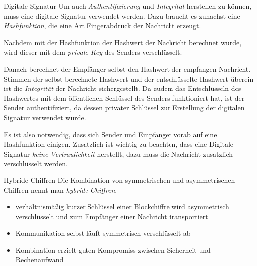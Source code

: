 \documentclass[german]{spicker}
\begin{document}
\begin{defi}{Digitale Signatur}
    Um auch \emph{Authentifizierung}
    und \emph{Integritat} herstellen zu können, muss eine digitale Signatur verwendet
    werden. Dazu braucht es zunachst eine \emph{Hashfunktion}, die eine Art Fingerabdruck
    der Nachricht erzeugt.

    Nachdem mit der Hashfunktion der Hashwert der Nachricht berechnet wurde, wird
    dieser mit dem \emph{private Key} des Senders verschlüsselt.

    Danach berechnet
    der Empfänger selbst den Hashwert der empfangen Nachricht. Stimmen der
    selbst berechnete Hashwert und der entschlüsselte Hashwert überein ist die \emph{Integrität} der Nachricht sichergestellt. Da zudem das Entschlüsseln des Hashwertes mit
    dem öffentlichen Schlüssel des Senders funktioniert hat, ist der Sender authentifiziert,
    da dessen privater Schlüssel zur Erstellung der digitalen Signatur verwendet
    wurde.

    Es ist also notwendig, dass sich Sender und Empfanger vorab auf eine
    Hashfunktion einigen. Zusatzlich ist wichtig zu beachten, dass eine Digitale Signatur
    \emph{keine Vertraulichkeit} herstellt, dazu muss die Nachricht zusatzlich verschlüsselt
    werden.
\end{defi}

\begin{defi}{Hybride Chiffren}
    Die Kombination von symmetrischen und asymmetrischen
    Chiffren nennt man \emph{hybride Chiffren}.

    \begin{itemize}
        \item verhältnismäßig kurzer Schlüssel einer Blockchiffre wird asymmetrisch verschlüsselt und zum Empfänger einer Nachricht transportiert
        \item Kommunikation selbst läuft symmetrisch verschlüsselt ab
        \item Kombination erzielt guten Kompromiss zwischen Sicherheit und Rechenaufwand
    \end{itemize}
\end{defi}

\printindex
\printindex[Beispiele]
\end{document}

